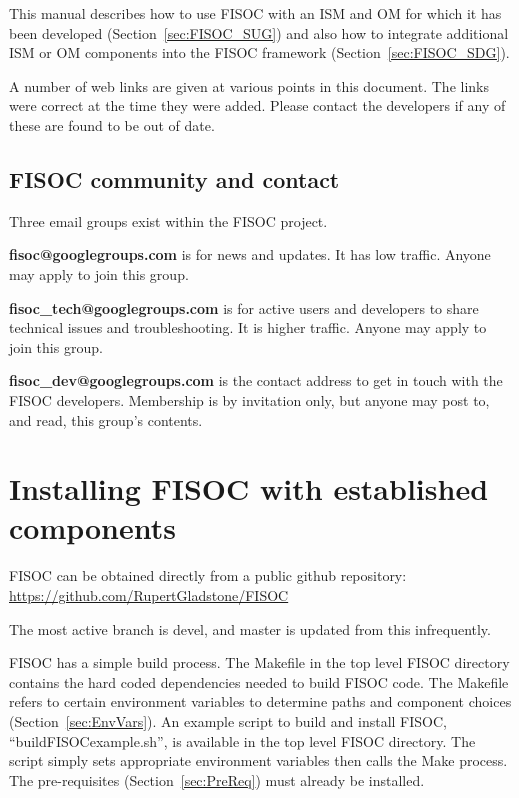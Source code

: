\documentclass[11pt]{article}
\begin{document}
This manual describes how to use FISOC with an ISM and OM for which it has been 
developed (Section~\ref{sec:FISOC_SUG}) and also how to integrate 
additional ISM or OM components 
into the FISOC framework (Section~\ref{sec:FISOC_SDG}).

A number of web links are given at various points in this document.  
The links were correct at the time they were added. 
Please contact the developers if any of these are found to be out of date. 

\subsection{FISOC community and contact}

Three email groups exist within the FISOC project.

\textbf{fisoc@googlegroups.com} is for news and updates. 
It has low traffic. 
Anyone may apply to join this group. 

\textbf{fisoc\_tech@googlegroups.com} is for active users and developers to
share technical issues and troubleshooting.
It is higher traffic.
Anyone may apply to join this group. 

\textbf{fisoc\_dev@googlegroups.com} is the contact address to get in touch
with the FISOC developers.
Membership is by invitation only, but anyone may post to, and read, this group's contents.




\section{Installing FISOC with established components}
\label{sec:FISOC_install}

FISOC can be obtained directly from a public github repository: \\
\url{https://github.com/RupertGladstone/FISOC}

The most active branch is devel, and master is updated from this infrequently. 

FISOC has a simple build process.  The Makefile in the top level FISOC directory contains the 
hard coded dependencies needed to build FISOC code.
The Makefile refers to certain 
environment variables to determine paths and component choices (Section~\ref{sec:EnvVars}). 
An example script to build and install FISOC, ``buildFISOCexample.sh'', is available in the top 
level FISOC directory.
The script simply sets appropriate environment variables then calls the Make process. 
The pre-requisites (Section~\ref{sec:PreReq}) must already be installed. 
\end{document}
